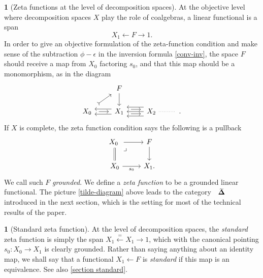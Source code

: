 \documentclass{amsart}
\makeatletter
\newcommand{\simpl}{\mathbf{\Delta}}
\newcommand*\wt[1]{\mathpalette\wthelper{#1}}
\newcommand*\wthelper[2]{%
        \hbox{\dimen@\accentfontxheight#1%
                \accentfontxheight#11.3\dimen@
                $\m@th#1\widetilde{#2}$%
                \accentfontxheight#1\dimen@
        }%
}
\newcommand*\accentfontxheight[1]{%
        \fontdimen5\ifx#1\displaystyle
                \textfont
        \else\ifx#1\textstyle
                \textfont
        \else\ifx#1\scriptstyle
                \scriptfont
        \else
                \scriptscriptfont
        \fi\fi\fi3
}
\newcommand{\Tsimpl}{\wt\simpl}
\newcommand{\drpullback}{\arrow[phantom]{dr}[very near start,description]{\lrcorner}}
\theoremstyle{definition}
\theoremstyle{noname}
\newtheorem{blanko}[theorem]{}
\makeatother
\begin{document}
\begin{blanko}[Zeta functions at the level of decomposition spaces]\label{zeta decomp}
  At the objective level where decomposition spaces $X$ play the role of coalgebras,
  a linear functional is a span
  $$
  X_1 \leftarrow F \to 1 .
  $$
  In order to give an objective formulation of the zeta-function condition and
  make sense of the subtraction $\phi-\epsilon$ in the inversion formula 
  \eqref{conv-inv}, the space $F$ 
  should receive a map from $X_0$ factoring $s_0$, and that this map should be 
  a monomorphism, as in the diagram
\begin{equation}\label{tilde-diagram}
\begin{tikzcd}
 & F \ar[d] && \\
X_0 \ar[ru, rightarrowtail, shorten >=1.2mm, shorten <=2.0mm] \ar[r, shorten >=1.4mm, shorten <=2.0mm] 
& X_1 
\ar[l, shift left=1.5]
\ar[l, shift right=1.5]
\ar[r, shift left=1.3, shorten >=1.4mm, shorten <=2.0mm]
\ar[r, shift right=1.3, shorten >=1.4mm, shorten <=2.0mm]
& X_2 
\ar[l, shift left=2.6]
\ar[l] 
\ar[l, shift right=2.6] \rar[dotted, no head]
& {} .
\end{tikzcd}
\end{equation}
If $X$ is complete, the zeta function condition says the following is a pullback
  \[
  \begin{tikzcd}
  X_0 \ar[d, equal] \drpullback \ar[r]  & F \ar[d]  \\
  X_0 \ar[r, "s_0"'] & X_1 .
  \end{tikzcd}
  \]
We call such $F$ {\em grounded}. We define a {\em zeta function} to be a grounded linear 
functional.
The picture \eqref{tilde-diagram} above leads to the category $\Tsimpl$ 
introduced in the next section, which is the setting for most of the technical
results of the paper.
\end{blanko}

\begin{blanko}[Standard zeta function]
  At the level of decomposition spaces, the {\em standard} zeta function is simply the
  span $X_1 \stackrel{=}\leftarrow X_1 \to 1$, which with the canonical 
  pointing $s_0: X_0\to X_1$ is clearly grounded. 
  Rather than saying anything about an identity map, we shall say that a functional
  $X_1 \leftarrow F$ is {\em standard} if this map is an equivalence.
  See also \cref{section standard}.
\end{blanko}
\end{document}
